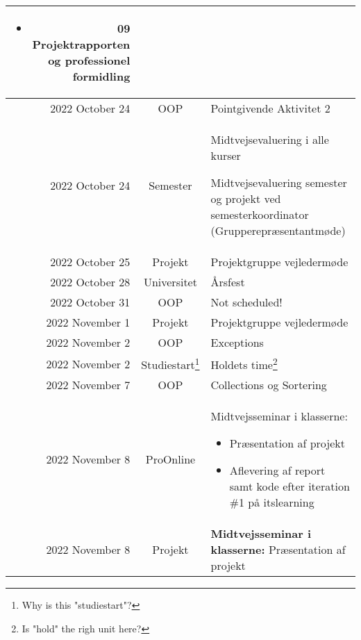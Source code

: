 \begin{longtable}{|r|c|p{}|}
\begin{itemize}[noitemsep,leftmargin=*,topsep=0pt,partopsep=0pt]
  \item 09 Projektrapporten og professionel formidling

\end{itemize} \\
  \hline
  \rowcolor{orange}2022 October 24 & OOP & Pointgivende Aktivitet 2 \\
  \hline
  2022 October 24 & Semester & Midtvejsevaluering i alle kurser

Midtvejsevaluering semester og projekt ved semesterkoordinator (Grupperepræsentantmøde) \\
  \hline
  2022 October 25 & Projekt & Projektgruppe vejledermøde \\
  \hline
  2022 October 28 & Universitet & Årsfest \\
  \hline
  2022 October 31 & OOP & Not scheduled! \\
  \hline
  2022 November 1 & Projekt & Projektgruppe vejledermøde \\
  \hline
  2022 November 2 & OOP & Exceptions \\
  \hline
  2022 November 2 & Studiestart\footnote{Why is this "studiestart"?} & Holdets time\footnote{Is "hold" the righ unit here?} \\
  \hline
  2022 November 7 & OOP & Collections og Sortering \\
  \hline
  2022 November 8 & ProOnline & Midtvejsseminar i klasserne:

\begin{itemize}[noitemsep,leftmargin=*,topsep=0pt,partopsep=0pt]

  \item Præsentation af projekt 

  \item Aflevering af report samt kode efter iteration \#1 på itslearning

\end{itemize} \\
  \hline
  2022 November 8 & Projekt & \textbf{Midtvejsseminar i klasserne:} Præsentation af projekt


\end{longtable}
